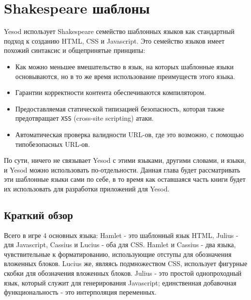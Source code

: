 \chapter{Shakespeare шаблоны}\label{ch:shakespeare}

Yesod использует Shakespeare семейство шаблонных языков как стандартный 
подход к созданию HTML, CSS и Javascript. Это семейство языков имеет похожий 
синтаксис и общепринятые принципы: 

\begin{itemize}
\item Как можно меньшее вмешательство в язык, на которых шаблонные языки 
основываются, но в то же время использование преимуществ этого языка.
\item Гарантии корректности контента обеспечиваются компилятором.
\item Предоставляемая статической типизацией безопасность, которая также 
предотвращает \texttt{XSS} (cross-site scripting) атаки.
\item Автоматическая проверка валидности URL-ов, где это возможно, с помощью 
типобезопасных URL-ов.
\end{itemize}

По сути, ничего не связывает Yesod с этими языками, другими словами, и языки, 
и Yesod можно использовать по-отдельности. Данная глава будет рассматривать 
эти шаблонные языки сами по себе, в то время как оставшаяся часть книги 
будет их использовать для разработки приложений для Yesod.

\section{Краткий обзор}

Всего в игре 4 основных языка: Hamlet - это шаблонный язык HTML, 
Julius - для Javascript, Cassius и Lucius - оба для CSS. Hamlet и Cassius - 
два языка, чувствительные к форматированию, использующие отступы для 
обозначения вложенных блоков. Lucius же, являясь подмножеством CSS, использует
фигурные скобки для обозначения вложенных блоков. 
Julius - это простой однопроходный язык, который служит для 
генерирования Javascript; единственная добавочная функциональность - это 
интерполяция переменных.

